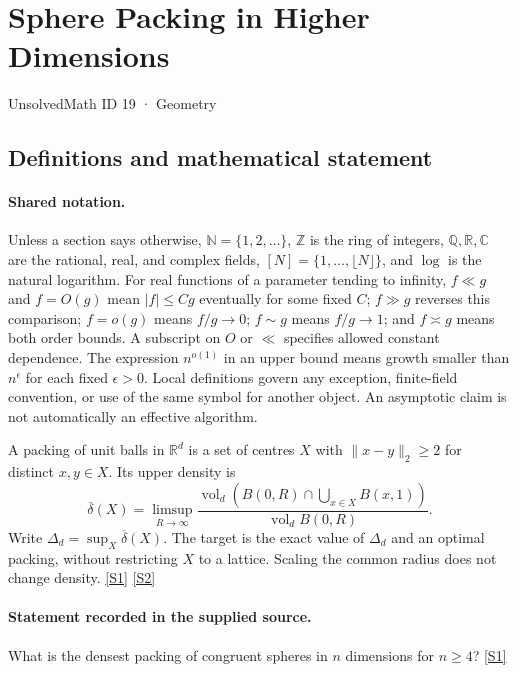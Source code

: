 \documentclass[11pt,a4paper]{article}
\newcommand{\N}{\mathbb{N}}
\newcommand{\Z}{\mathbb{Z}}
\newcommand{\Q}{\mathbb{Q}}
\newcommand{\R}{\mathbb{R}}
\newcommand{\C}{\mathbb{C}}
\newcommand{\sref}[2]{\hyperlink{source:#1:#2}{[S#2]}}
\begin{document}

\setcounter{section}{18}

\section{Sphere Packing in Higher Dimensions}\label{19}

{\small\sffamily UnsolvedMath ID 19 · Geometry}

\subsection{Definitions and mathematical statement}

\paragraph{Shared notation.}Unless a section says otherwise, $\N=\{1,2,\ldots\}$,
$\Z$ is the ring of integers, $\Q,\R,\C$ are the rational, real, and complex
fields, $[N]=\{1,\ldots,\lfloor N\rfloor\}$, and $\log$ is the natural
logarithm. For real functions of a parameter tending to infinity,
$f\ll g$ and $f=O(g)$ mean $|f|\leq Cg$ eventually for some fixed $C$;
$f\gg g$ reverses this comparison; $f=o(g)$ means $f/g\to0$;
$f\sim g$ means $f/g\to1$; and $f\asymp g$ means both order bounds.
A subscript on $O$ or $\ll$ specifies allowed constant dependence.
The expression $n^{o(1)}$ in an upper bound means growth smaller than
$n^\epsilon$ for each fixed $\epsilon>0$. Local definitions govern any
exception, finite-field convention, or use of the same symbol for another
object. An asymptotic claim is not automatically an effective algorithm.



A packing of unit balls in $\R^d$ is a set of centres $X$ with $\|x-y\|_2\geq2$ for distinct $x,y\in X$. Its upper density is
\[\overline\delta(X)=\limsup_{R\to\infty}\frac{\operatorname{vol}_d(B(0,R)\cap\bigcup_{x\in X}B(x,1))}{\operatorname{vol}_d B(0,R)}.\]
Write $\Delta_d=\sup_X\overline\delta(X)$. The target is the exact value of $\Delta_d$ and an optimal packing, without restricting $X$ to a lattice. Scaling the common radius does not change density. \sref{19}{1} \sref{19}{2}

\paragraph{Statement recorded in the supplied source.}
What is the densest packing of congruent spheres in $n$ dimensions for $n \geq 4$? \sref{19}{1}
\end{document}
